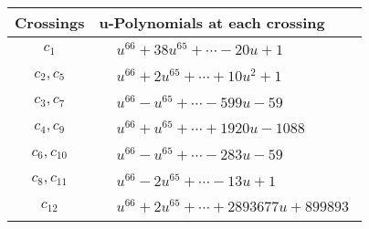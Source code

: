 \documentclass[1p]{elsarticle_modified}
\theoremstyle{definition}
\begin{document}
\begin{tabular}{m{50pt}|m{274pt}}
Crossings & \hspace{64pt}u-Polynomials at each crossing \\
\hline $$\begin{aligned}c_{1}\end{aligned}$$&$\begin{aligned}
&u^{66}+38 u^{65}+\cdots-20 u+1
\end{aligned}$\\
\hline $$\begin{aligned}c_{2},c_{5}\end{aligned}$$&$\begin{aligned}
&u^{66}+2 u^{65}+\cdots+10 u^2+1
\end{aligned}$\\
\hline $$\begin{aligned}c_{3},c_{7}\end{aligned}$$&$\begin{aligned}
&u^{66}- u^{65}+\cdots-599 u-59
\end{aligned}$\\
\hline $$\begin{aligned}c_{4},c_{9}\end{aligned}$$&$\begin{aligned}
&u^{66}+u^{65}+\cdots+1920 u-1088
\end{aligned}$\\
\hline $$\begin{aligned}c_{6},c_{10}\end{aligned}$$&$\begin{aligned}
&u^{66}- u^{65}+\cdots-283 u-59
\end{aligned}$\\
\hline $$\begin{aligned}c_{8},c_{11}\end{aligned}$$&$\begin{aligned}
&u^{66}-2 u^{65}+\cdots-13 u+1
\end{aligned}$\\
\hline $$\begin{aligned}c_{12}\end{aligned}$$&$\begin{aligned}
&u^{66}+2 u^{65}+\cdots+2893677 u+899893
\end{aligned}$\\
\hline
\end{tabular}\\~\\
\newpage\renewcommand{\arraystretch}{1}
\end{document}

